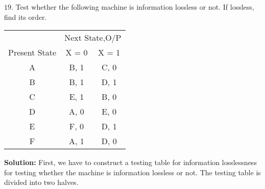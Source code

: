 \documentclass[a4,9pt]{beamer}
\begin{document}
\begin{frame}
$19.$ Test whether the following machine is information lossless or not. If lossless, find its order.

\pause
\begin{center}
  \begin{tabular}{ccc}
\hline

\hline

\hline

\hline
 & \multicolumn{2}{c}{Next State,O/P}\\
 \cline{2-3}
Present State & X = 0 & X = 1\\
\hline
  A    &    B, 1     &    C, 0 \\
  B    &    B, 1     &    D, 1 \\
  C    &    E, 1     &    B, 0 \\
  D    &    A, 0     &    E, 0 \\
  E    &    F, 0     &    D, 1 \\
  F    &    A, 1     &    D, 0 \\
\hline

\hline

\hline

\hline

  \end{tabular}
\end{center}

\pause
\large{\textbf{Solution:}} \small{First, we have to construct a testing table for information losslessness for testing whether the machine is information lossless or not. The testing table is divided into two halves.}

\end{frame}
\end{document}
